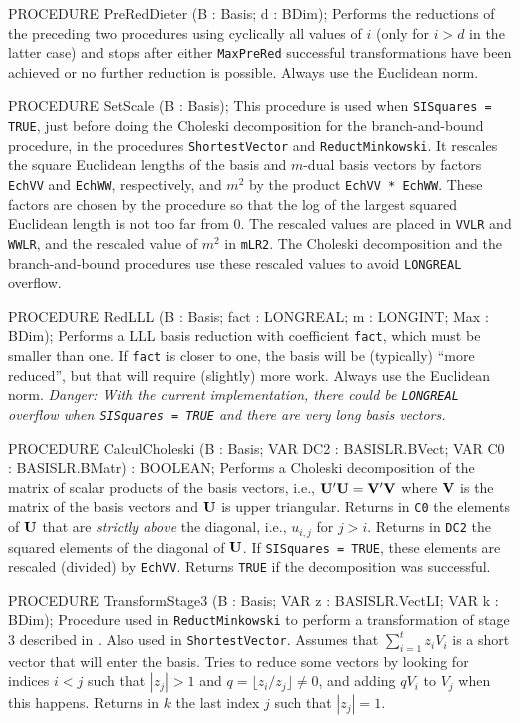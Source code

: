 PROCEDURE PreRedDieter (B : Basis;  d : BDim);
\endcode
  \tab  Performs the reductions of the preceding two procedures 
  using cyclically all values of $i$ (only for $i > d$ in the latter case)
  and stops after either {\tt MaxPreRed} successful transformations have been 
  achieved or no further reduction is possible.
  Always use the Euclidean norm.
  \endtab
\code

PROCEDURE SetScale (B : Basis);
\endcode
\tab  This procedure is used when {\tt SISquares = TRUE}, 
   just before doing the Choleski decomposition
   for the branch-and-bound procedure, in the procedures {\tt ShortestVector}
   and {\tt ReductMinkowski}.
   It rescales the square Euclidean lengths of the basis and $m$-dual 
   basis vectors by factors {\tt EchVV} and {\tt EchWW}, respectively,
   and $m^2$ by the product {\tt EchVV * EchWW}.
   These factors are chosen by the procedure 
   so that the log of the largest squared
   Euclidean length is not too far from 0.
   The rescaled values are placed in {\tt VVLR} and {\tt WWLR}, and the 
   rescaled value of $m^2$ in {\tt mLR2}.
   The Choleski decomposition and the branch-and-bound procedures
   use these rescaled values to avoid {\tt LONGREAL} overflow.
\endtab
\code

PROCEDURE RedLLL (B : Basis;  fact : LONGREAL;  m : LONGINT;  Max : BDim);
\endcode
  \tab  Performs a LLL basis reduction with coefficient {\tt fact}, which must
   be smaller than one.  If {\tt fact} is closer to one, the basis will be
   (typically) ``more reduced'', but that will require (slightly) more work.
   Always use the Euclidean norm.
   {\em Danger: With the current implementation, there could be {\tt LONGREAL}
   overflow when {\tt SISquares = TRUE} and there are very long basis vectors.}
  \endtab
\code

PROCEDURE CalculCholeski (B : Basis;  VAR DC2 : BASISLR.BVect;
                          VAR C0 : BASISLR.BMatr) : BOOLEAN;
\endcode
\tab  Performs a Choleski decomposition of the matrix of scalar
  products of the basis vectors, i.e., ${\bf U}'{\bf U} = {\bf V}'{\bf V}$ where ${\bf V}$
  is the matrix of the basis vectors and ${\bf U}$ is upper triangular.
  Returns in {\tt C0} the elements of ${\bf U}$ that are {\em strictly above\/}
  the diagonal, i.e., $u_{i,j}$ for $j > i$.
  Returns in {\tt DC2} the squared elements of the diagonal of ${\bf U}$.
  If {\tt SISquares = TRUE}, these elements are rescaled (divided) by
  {\tt EchVV}.  Returns {\tt TRUE} if the decomposition was successful.
\endtab
\code

PROCEDURE TransformStage3 (B : Basis;  VAR z : BASISLR.VectLI;  VAR k : BDim);
\endcode
 \tab Procedure used in {\tt ReductMinkowski} to perform a transformation
  of stage 3 described in \cite{rAFF85a}. Also used in {\tt ShortestVector}.
  Assumes that $\sum_{i=1}^t z_i V_i$ is a short vector that will enter
  the basis.  Tries to reduce some vectors by looking for indices $i < j$
  such that $|z_j| > 1$ and $q=\lfloor z_i/z_j\rfloor \not=0$,
  and adding $q V_i$ to $V_j$ when this happens.
  Returns in $k$ the last index $j$ such that $|z_j|=1$.
 \endtab
\code

